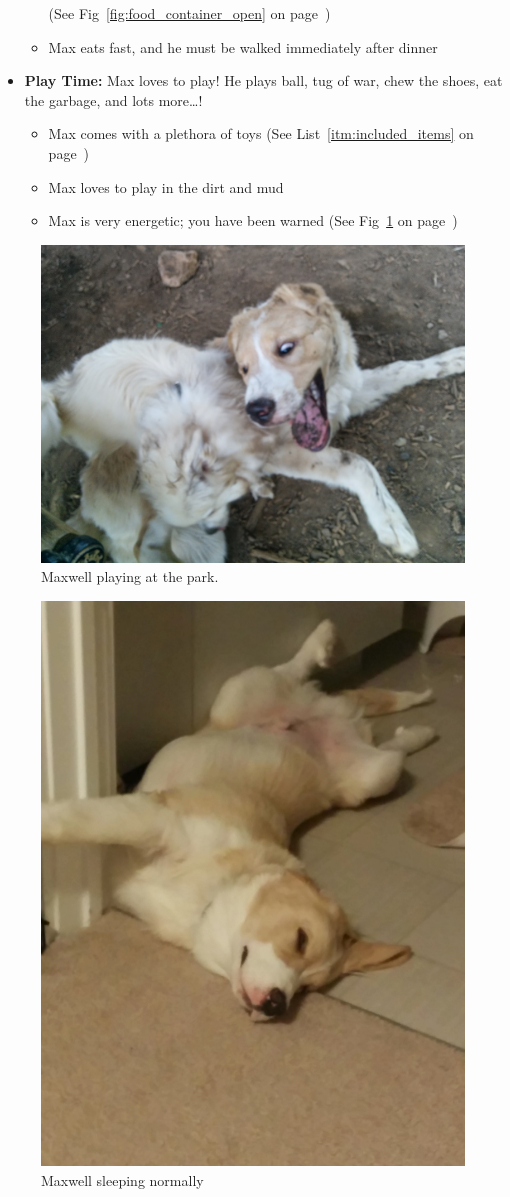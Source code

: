 \documentclass[pdftex,12pt]{article}
\begin{document}
\begin{itemize}
\begin{itemize}
                (See Fig~\ref{fig:food_container_open} on
                page~\pageref{fig:food_container_open})
            \item Max eats fast, and he must be walked immediately after dinner
        \end{itemize}
    \item \textbf{Play Time:} Max loves to play! He plays ball, tug of war, chew
        the shoes, eat the garbage, and lots more\ldots!
        \begin{itemize}
            \item Max comes with a plethora of toys
                (See List~\ref{itm:included_items} on
                page~\pageref{itm:included_items})
            \item Max loves to play in the dirt and mud
            \item Max is very energetic; you have been warned
                (See Fig~\ref{fig:at_the_park} on
                page~\pageref{fig:at_the_park})
        \end{itemize}
\end{itemize}

\clearpage

\vspace*{\fill}

\begin{figure}[h!]
    \centering
    \includegraphics[width=.35\textwidth]{./images/max/at_the_park.jpg}
    \caption{Maxwell playing at the park.}
    \label{fig:at_the_park}
\end{figure}

\bigskip

\begin{figure}[h!]
    \centering
    \includegraphics[width=.35\textwidth]{./images/max/sleeping.jpg}
    \caption{Maxwell sleeping normally}
    \label{fig:sleeping}
\end{figure}
\end{document}
